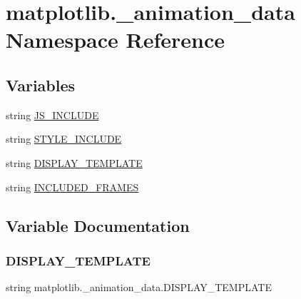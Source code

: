 \hypertarget{namespacematplotlib_1_1__animation__data}{}\section{matplotlib.\+\_\+animation\+\_\+data Namespace Reference}
\label{namespacematplotlib_1_1__animation__data}
\subsection*{Variables}
\begin{DoxyCompactItemize}
\item 
string \hyperlink{namespacematplotlib_1_1__animation__data_ad9d53011f41ef8e1065e76678f886f5d}{J\+S\+\_\+\+I\+N\+C\+L\+U\+DE}
\item 
string \hyperlink{namespacematplotlib_1_1__animation__data_adeabfe6de104b3217e01ecbda1001506}{S\+T\+Y\+L\+E\+\_\+\+I\+N\+C\+L\+U\+DE}
\item 
string \hyperlink{namespacematplotlib_1_1__animation__data_a5abce4fa6c2f45afdb4bb3eb72295fbf}{D\+I\+S\+P\+L\+A\+Y\+\_\+\+T\+E\+M\+P\+L\+A\+TE}
\item 
string \hyperlink{namespacematplotlib_1_1__animation__data_a5271d1d65d2f505e44ca79d7ddd5be1c}{I\+N\+C\+L\+U\+D\+E\+D\+\_\+\+F\+R\+A\+M\+ES}
\end{DoxyCompactItemize}


\subsection{Variable Documentation}
\mbox{\label{namespacematplotlib_1_1__animation__data_a5abce4fa6c2f45afdb4bb3eb72295fbf}} 
\subsubsection{\texorpdfstring{D\+I\+S\+P\+L\+A\+Y\+\_\+\+T\+E\+M\+P\+L\+A\+TE}{DISPLAY\_TEMPLATE}}
{\footnotesize\ttfamily string matplotlib.\+\_\+animation\+\_\+data.\+D\+I\+S\+P\+L\+A\+Y\+\_\+\+T\+E\+M\+P\+L\+A\+TE}

